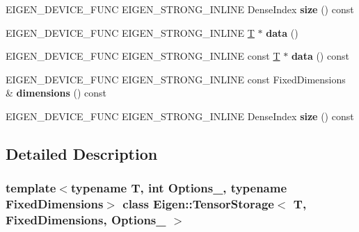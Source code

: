 \begin{DoxyCompactItemize}
E\+I\+G\+E\+N\+\_\+\+D\+E\+V\+I\+C\+E\+\_\+\+F\+U\+NC E\+I\+G\+E\+N\+\_\+\+S\+T\+R\+O\+N\+G\+\_\+\+I\+N\+L\+I\+NE Dense\+Index {\bfseries size} () const
\item 
\mbox{\label{class_eigen_1_1_tensor_storage_3_01_t_00_01_fixed_dimensions_00_01_options___01_4_a847de4b8dfd51fbeaa075cb70588259f}} 
E\+I\+G\+E\+N\+\_\+\+D\+E\+V\+I\+C\+E\+\_\+\+F\+U\+NC E\+I\+G\+E\+N\+\_\+\+S\+T\+R\+O\+N\+G\+\_\+\+I\+N\+L\+I\+NE \hyperlink{group___sparse_core___module}{T} $\ast$ {\bfseries data} ()
\item 
\mbox{\label{class_eigen_1_1_tensor_storage_3_01_t_00_01_fixed_dimensions_00_01_options___01_4_a8cc65992eafaa8b49cb0077f5a37f4b3}} 
E\+I\+G\+E\+N\+\_\+\+D\+E\+V\+I\+C\+E\+\_\+\+F\+U\+NC E\+I\+G\+E\+N\+\_\+\+S\+T\+R\+O\+N\+G\+\_\+\+I\+N\+L\+I\+NE const \hyperlink{group___sparse_core___module}{T} $\ast$ {\bfseries data} () const
\item 
\mbox{\label{class_eigen_1_1_tensor_storage_3_01_t_00_01_fixed_dimensions_00_01_options___01_4_a96ded02ef2c153df12e49a8905763a22}} 
E\+I\+G\+E\+N\+\_\+\+D\+E\+V\+I\+C\+E\+\_\+\+F\+U\+NC E\+I\+G\+E\+N\+\_\+\+S\+T\+R\+O\+N\+G\+\_\+\+I\+N\+L\+I\+NE const Fixed\+Dimensions \& {\bfseries dimensions} () const
\item 
\mbox{\label{class_eigen_1_1_tensor_storage_3_01_t_00_01_fixed_dimensions_00_01_options___01_4_a29d2bd724aa1855c4114974de5fd5b85}} 
E\+I\+G\+E\+N\+\_\+\+D\+E\+V\+I\+C\+E\+\_\+\+F\+U\+NC E\+I\+G\+E\+N\+\_\+\+S\+T\+R\+O\+N\+G\+\_\+\+I\+N\+L\+I\+NE Dense\+Index {\bfseries size} () const
\end{DoxyCompactItemize}


\subsection{Detailed Description}
\subsubsection*{template$<$typename T, int Options\+\_\+, typename Fixed\+Dimensions$>$\newline
class Eigen\+::\+Tensor\+Storage$<$ T, Fixed\+Dimensions, Options\+\_\+ $>$}



